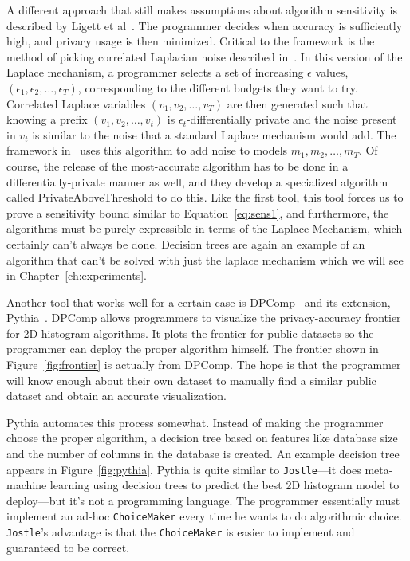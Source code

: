\documentclass[11pt]{report}
\newcommand{\Jostle}{\texttt{Jostle}}
\renewcommand{\t}[1]{\texttt{#1}}
\begin{document}
A different approach that still makes assumptions about algorithm sensitivity is described by Ligett et al~\cite{Ligett:2017}. The programmer decides when accuracy is sufficiently high, and privacy usage is then minimized. Critical to the framework is the method of picking correlated Laplacian noise described in~\cite{Koufogiannis:2015}. In this version of the Laplace mechanism, a programmer selects a set of increasing $\epsilon$ values, $(\epsilon_1, \epsilon_2, \ldots, \epsilon_T)$, corresponding to the different budgets they want to try. Correlated Laplace variables $(v_1, v_2, \ldots, v_T)$ are then generated such that knowing a prefix $(v_1, v_2, \ldots, v_t)$ is $\epsilon_t$-differentially private and the noise present in $v_t$ is similar to the noise that a standard Laplace mechanism would add. The framework in~\cite{Ligett:2017} uses this algorithm to add noise to models $m_1, m_2, \ldots, m_T$. Of course, the release of the most-accurate algorithm has to be done in a differentially-private manner as well, and they develop a specialized algorithm called PrivateAboveThreshold to do this. Like the first tool, this tool forces us to prove a sensitivity bound similar to Equation~\ref{eq:sens1}, and furthermore, the algorithms must be purely expressible in terms of the Laplace Mechanism, which certainly can't always be done. Decision trees are again an example of an algorithm that can't be solved with just the laplace mechanism which we will see in Chapter~\ref{ch:experiments}.

Another tool that works well for a certain case is DPComp~\cite{Hay:2016} and its extension, Pythia~\cite{Kotsogiannis:2017}. DPComp allows programmers to visualize the privacy-accuracy frontier for 2D histogram algorithms. It plots the frontier for public datasets so the programmer can deploy the proper algorithm himself. The frontier shown in Figure~\ref{fig:frontier} is actually from DPComp. The hope is that the programmer will know enough about their own dataset to manually find a similar public dataset and obtain an accurate visualization.

Pythia automates this process somewhat. Instead of making the programmer choose the proper algorithm, a decision tree based on features like database size and the number of columns in the database is created. An example decision tree appears in Figure~\ref{fig:pythia}. Pythia is quite similar to \Jostle{}---it does meta-machine learning using decision trees to predict the best 2D histogram model to deploy---but it's not a programming language. The programmer essentially must implement an ad-hoc \t{ChoiceMaker} every time he wants to do algorithmic choice. \Jostle{}'s advantage is that the \t{ChoiceMaker} is easier to implement and guaranteed to be correct.
\end{document}
